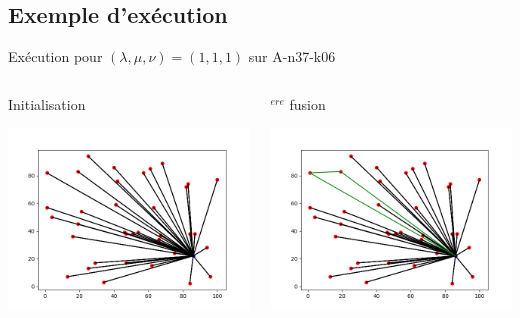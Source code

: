 \documentclass{beamer}
\begin{document}
\subsection{Exemple d'exécution}
\begin{frame}{Exécution pour $(\lambda,\mu,\nu) = (1,1,1)$ sur A-n37-k06}

 \begin{columns}[t]
  \begin{column}{4cm}
  	\centering
  	Initialisation
  	
	\includegraphics[scale=0.25]{CWinit.png}
	
	
  \end{column}
  
  \begin{column}{4cm}
  	$^{ere}$ fusion
  	
	\includegraphics[scale=0.25]{CW1.png}
 

\end{column}
\end{columns}
\end{frame}
\end{document}
